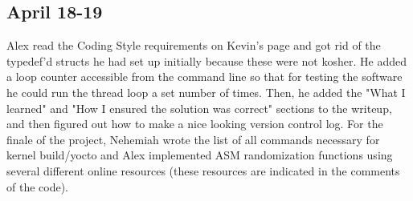 \documentclass[letterpaper,10pt,titlepage]{article}
\begin{document}
\subsection{April 18-19}
Alex read the Coding Style requirements on Kevin's page and got rid of the typedef'd structs he had set up initially because these were not kosher. He added a loop counter accessible from the command line so that for testing the software he could run the thread loop a set number of times. Then, he added the "What I learned" and "How I ensured the solution was correct" sections to the writeup, and then figured out how to make a nice looking version control log. For the finale of the project, Nehemiah wrote the list of all commands necessary for kernel build/yocto and Alex implemented ASM randomization functions using several different online resources (these resources are indicated in the comments of the code). 

%
%
\end{document}
